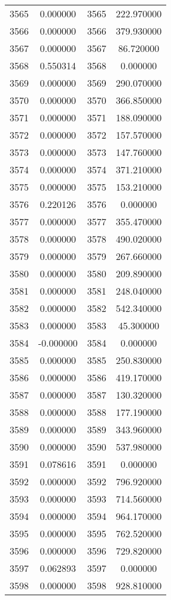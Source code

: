 \documentclass[12pt]{article}
\begin{document}
\begin{longtable}{@{}cccc@{}}
3565 & 0.000000 & 3565 & 222.970000 \\
3566 & 0.000000 & 3566 & 379.930000 \\
3567 & 0.000000 & 3567 & 86.720000 \\
3568 & 0.550314 & 3568 & 0.000000 \\
3569 & 0.000000 & 3569 & 290.070000 \\
3570 & 0.000000 & 3570 & 366.850000 \\
3571 & 0.000000 & 3571 & 188.090000 \\
3572 & 0.000000 & 3572 & 157.570000 \\
3573 & 0.000000 & 3573 & 147.760000 \\
3574 & 0.000000 & 3574 & 371.210000 \\
3575 & 0.000000 & 3575 & 153.210000 \\
3576 & 0.220126 & 3576 & 0.000000 \\
3577 & 0.000000 & 3577 & 355.470000 \\
3578 & 0.000000 & 3578 & 490.020000 \\
3579 & 0.000000 & 3579 & 267.660000 \\
3580 & 0.000000 & 3580 & 209.890000 \\
3581 & 0.000000 & 3581 & 248.040000 \\
3582 & 0.000000 & 3582 & 542.340000 \\
3583 & 0.000000 & 3583 & 45.300000 \\
3584 & -0.000000 & 3584 & 0.000000 \\
3585 & 0.000000 & 3585 & 250.830000 \\
3586 & 0.000000 & 3586 & 419.170000 \\
3587 & 0.000000 & 3587 & 130.320000 \\
3588 & 0.000000 & 3588 & 177.190000 \\
3589 & 0.000000 & 3589 & 343.960000 \\
3590 & 0.000000 & 3590 & 537.980000 \\
3591 & 0.078616 & 3591 & 0.000000 \\
3592 & 0.000000 & 3592 & 796.920000 \\
3593 & 0.000000 & 3593 & 714.560000 \\
3594 & 0.000000 & 3594 & 964.170000 \\
3595 & 0.000000 & 3595 & 762.520000 \\
3596 & 0.000000 & 3596 & 729.820000 \\
3597 & 0.062893 & 3597 & 0.000000 \\
3598 & 0.000000 & 3598 & 928.810000 \\

\end{longtable}
\end{document}
